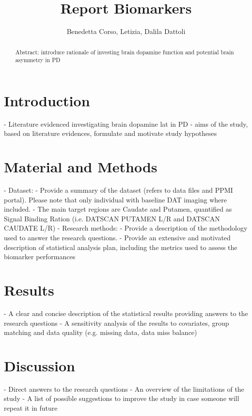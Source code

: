 \documentclass[]{article}
\title{Report Biomarkers}
\author{Benedetta Corso, Letizia, Dalila Dattoli}
\begin{document}
\maketitle

\begin{abstract}
Abstract: introduce rationale of investing brain dopamine function and potential brain asymmetry in PD
\end{abstract}

\section{Introduction}

- Literature evidenced investigating brain dopamine lat in PD
- aims of the study, based on literature evidences, 
formulate and motivate study hypotheses

\section{Material and Methods}

- Dataset:
\newline
	- Provide a summary of the dataset (refers to data files and PPMI
	portal). Please note that only individual with baseline DAT imaging 
	where included.
\newline
	- The main target regions are Caudate and Putamen, quantified as 
	Signal Binding Ration (i.e. DATSCAN PUTAMEN L/R and 
	DATSCAN CAUDATE L/R)
\newline
- Research methods:
\newline
	- Provide a description of the methodology used to answer the research 
	questions. 
	\newline
	- Provide an extensive and motivated description of statistical analysis plan, including the metrics used to assess the biomarker 
	performances

\section{Results}

- A clear and concise description of the statistical results 
providing answers to the research questions
\newline
- A sensitivity analysis of the results to covariates, group  matching and data quality (e.g. missing data, data miss balance)

\section{Discussion}

- Direct answers to the research questions
\newline
- An overview of the limitations of the study
\newline
- A list of possible suggestions to improve the study in case 
someone will repeat it in future
\end{document}
